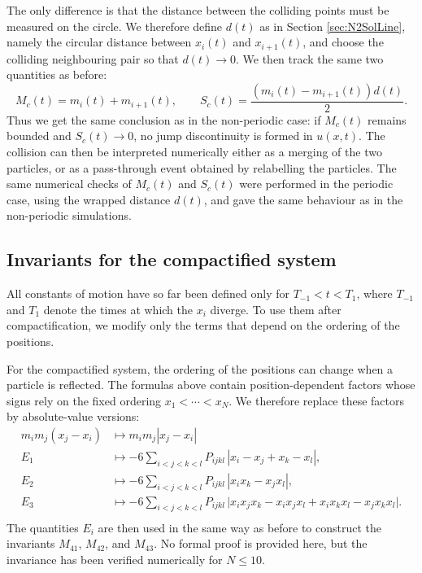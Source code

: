 \documentclass[english,master]{liumaiex}
\theoremstyle{thesisplain}
\theoremstyle{thesisdefinition}
\numberwithin{equation}{section}
\begin{document}
The only difference is that the distance between the colliding points must be measured on the circle. We therefore define $d(t)$ as in Section \ref{sec:N2SolLine}, namely the circular distance between $x_i(t)$ and $x_{i+1}(t)$, and choose the colliding neighbouring pair so that $d(t)\to0$. We then track the same two quantities as before:
\begin{equation}
	M_c(t)=m_i(t)+m_{i+1}(t),
	\qquad
	S_c(t)=\frac{(m_i(t)-m_{i+1}(t))d(t)}{2}.
\end{equation}
Thus we get the same conclusion as in the non-periodic case: if $M_c(t)$ remains bounded and $S_c(t)\to0$, no jump discontinuity is formed in $u(x,t)$. The collision can then be interpreted numerically either as a merging of the two particles, or as a pass-through event obtained by relabelling the particles. The same numerical checks of $M_c(t)$ and $S_c(t)$ were performed in the periodic case, using the wrapped distance $d(t)$, and gave the same behaviour as in the non-periodic simulations.

\subsection{Invariants for the compactified system}

All constants of motion have so far been defined only for $T_{-1} < t < T_1$, where $T_{-1}$ and $T_1$ denote the times at which the $x_i$ diverge. To use them after compactification, we modify only the terms that depend on the ordering of the positions.

For the compactified system, the ordering of the positions can change when a particle is reflected. The formulas above contain position-dependent factors whose signs rely on the fixed ordering $x_1<\cdots<x_N$. We therefore replace these factors by absolute-value versions:
\begin{align}
	m_i m_j (x_j - x_i) &\mapsto m_i m_j |x_j - x_i|	 \\
	E_1 &\mapsto -6 \sum_{i < j < k < l} P_{ijkl}\,|x_i - x_j + x_k - x_l|, \\
	E_2 &\mapsto -6 \sum_{i < j < k < l} P_{ijkl}\,|x_i x_k - x_j x_l|, \\
	E_3 &\mapsto -6 \sum_{i < j < k < l} P_{ijkl}\, \big| x_i x_j x_k - x_i x_j x_l + x_i x_k x_l - x_j x_k x_l \big|. \\
\end{align}
The quantities $E_i$ are then used in the same way as before to construct the invariants $M_{41}$, $M_{42}$, and $M_{43}$. No formal proof is provided here, but the invariance has been verified numerically for $N\le 10$.
\end{document}
